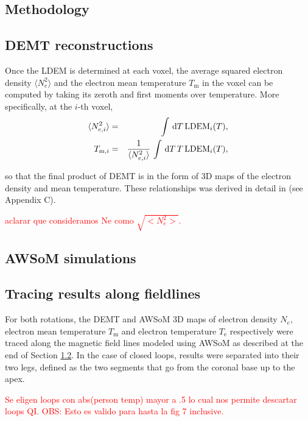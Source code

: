 \documentclass[namedreferences]{solarphysics}
\newcommand{\LDEM}{{\rm LDEM}}
\begin{document}
\begin{article}
\section{Methodology}\label{meto}   

\subsection{DEMT reconstructions}\label{demt} 

Once the LDEM is determined at each voxel, the average squared electron density $\langle N_e^2 \rangle$ and the electron mean temperature $T_\textrm{m}$ in the voxel can be computed by taking its zeroth and first moments over temperature. More specifically, at the $i$-th voxel,
\begin{eqnarray}\label{momento1}
 \langle N_{e,i}^2 \rangle &=& \int\,\textrm{d}T\,\LDEM_i(T),\label{Ne} \\ 
\label{momento2}
 T_{\textrm{m},i}   &=& \frac{1}{\langle N_{e,i}^2 \rangle}\,\int\,\textrm{d}T\,T\,\LDEM_i(T),\label{Tm} 
\end{eqnarray}


so that the final product of DEMT is in the form of 3D maps of the electron density and mean temperature. These relationships was derived in detail in \citealt{frazin_2009} (see Appendix C). 

\textcolor{red}{aclarar que consideramos Ne como $\sqrt{<N_e ^2>}$.}

\subsection{AWSoM simulations}\label{awsom} 

\subsection{Tracing results along fieldlines}\label{trace} 

For both rotations, the DEMT and AWSoM 3D maps of electron density $N_e$, electron mean temperature $T_\textrm{m}$ and electron temperature $T_\textrm{e}$ respectively were traced along the magnetic field lines modeled using AWSoM as described at the end of Section \ref{awsom}. In the case of closed loops, results were separated into their two legs, defined as the two segments that go from the coronal base up to the apex.


\textcolor{red}{Se eligen loops con abs(person temp) mayor a .5 lo cual nos permite descartar loops QI.
OBS: Esto es valido para hasta la fig 7 inclusive.}



\end{article}
\end{document}
